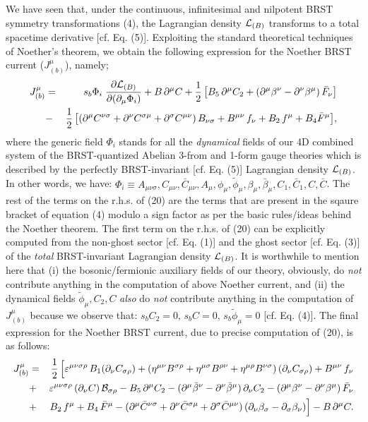 \documentclass[12pt]{article}
\begin{document}
We have seen that, under the continuous, infinitesimal and nilpotent BRST symmetry transformations (4), the Lagrangian density ${\cal L}_{(B)}$ transforms 
to a total spacetime derivative [cf. Eq. (5)]. Exploiting the standard theoretical techniques of Noether's theorem, we obtain the following
expression for the Noether BRST current ($J^\mu_{(b)} $), namely;
\begin{eqnarray}\label{20}
J^\mu_{(b)} &=&  s_b \Phi_i \; \dfrac {\partial {\cal L}_{(B)}}{\partial (\partial_\mu \Phi_i)} + B\, \partial^\mu C 
+ \dfrac{1}{2}\, \big [B_5 \, \partial^\mu C_2 + (\partial^\mu \beta^\nu - \partial^\nu \beta^\mu)\, \bar F_\nu \big ]
\nonumber\\
&-& \dfrac{1}{2}\, \big [(\partial^\mu C^{\nu\sigma} + \partial^\nu C^{\sigma\mu} + \partial^\sigma C^{\mu\nu})\, B_{\nu\sigma}
+ B^{\mu\nu}\, f_\nu + B_2\, f^\mu + B_4 \bar F^\mu \big],
\end{eqnarray}
where the generic field $\Phi_i$ stands for all the {\it dynamical} fields of our 4D combined system of the BRST-quantized Abelian 3-from and 1-form gauge theories
which is described by the perfectly BRST-invariant [cf. Eq. (5)] Lagrangian density ${\cal L}_{(B)}$.
In other words, we have: $\Phi_i \equiv A_{\mu\nu\sigma},  C_{\mu\nu}, \bar C_{\mu\nu}, A_\mu, \phi_\mu, \tilde \phi_\mu, \beta_\mu, \bar \beta_\mu, 
C_1, \bar C_1, C, \bar C $. The rest of the terms on the r.h.s. of (20) are the terms that are present in the sqaure bracket of equation (4) modulo
a sign factor as per the basic rules/ideas behind the Noether theorem. The first term on the r.h.s. of (20) can be explicitly computed from the non-ghost sector 
 [cf. Eq. (1)] and the ghost sector [cf. Eq. (3)] of the {\it total} BRST-invariant Lagrangian density  ${\cal L}_{(B)}$. It is worthwhile to 
 mention here that (i) the bosonic/fermionic auxiliary fields  of our theory, obviously, do {\it not} contribute 
anything in the computation of above Noether current, and
 (ii) the dynamical fields $\tilde \phi_\mu, C_2, C$ {\it also} do {\it not} contribute 
anything in the computation of $J^\mu_{(b)} $ because we observe that:
 $s_b C_2 = 0, \, s_b C = 0, \,s_b \widetilde \phi_\mu = 0$ [cf. Eq. (4)]. The final expression for the  Noether BRST current, due to
precise computation of (20),  is as follows: 
\begin{eqnarray}\label{21}
J^\mu_{(b)} &=&  \dfrac{1}{2}\, \Big [\varepsilon^{\mu\nu\sigma\rho}\, B_1 (\partial_\nu C_{\sigma\rho}) 
+  (\eta^{\mu\nu}  B^{\sigma\rho} + \eta^{\mu\sigma} B^{\rho\nu} + \eta^{\mu\rho} B^{\nu\sigma})\, (\partial_\nu C_{\sigma\rho})
 + B^{\mu\nu}\,f_\nu  
\nonumber\\
&+& \varepsilon^{\mu\nu\sigma\rho}\, (\partial_\nu C)\, {\cal B}_{\sigma\rho} - B_5 \, \partial^\mu C_2 - (\partial^\mu \bar \beta^\nu 
- \partial^\nu \bar \beta^\mu)\, \partial_\nu C_2 - (\partial^\mu \beta^\nu - \partial^\nu \beta^\mu)\, \bar F_\nu  \nonumber\\
&+& B_2\, f^\mu + B_4\, \bar F^\mu - (\partial^\mu \bar C^{\nu\sigma} + \partial^\nu \bar C^{\sigma\mu} + \partial^\sigma \bar C^{\mu\nu})\,(\partial_\nu \beta_\sigma 
- \partial_\sigma \beta_\nu) \Big ] - B \, \partial^\mu C.
\end{eqnarray}
\end{document}
